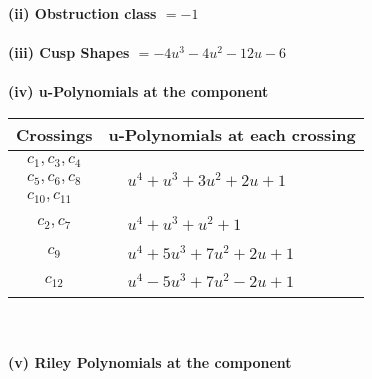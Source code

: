 \documentclass[1p]{elsarticle_modified}
\theoremstyle{definition}
\begin{document}
\flushleft \textbf{(ii) Obstruction class $= -1$}\\~\\
\flushleft \textbf{(iii) Cusp Shapes $= -4 u^3-4 u^2-12 u-6$}\\~\\
\newpage\renewcommand{\arraystretch}{1}
\flushleft \textbf{(iv) u-Polynomials at the component}\newline \\
\begin{tabular}{m{50pt}|m{274pt}}
Crossings & \hspace{64pt}u-Polynomials at each crossing \\
\hline $$\begin{aligned}c_{1},c_{3},c_{4}\\c_{5},c_{6},c_{8}\\c_{10},c_{11}\end{aligned}$$&$\begin{aligned}
&u^4+u^3+3 u^2+2 u+1
\end{aligned}$\\
\hline $$\begin{aligned}c_{2},c_{7}\end{aligned}$$&$\begin{aligned}
&u^4+u^3+u^2+1
\end{aligned}$\\
\hline $$\begin{aligned}c_{9}\end{aligned}$$&$\begin{aligned}
&u^4+5 u^3+7 u^2+2 u+1
\end{aligned}$\\
\hline $$\begin{aligned}c_{12}\end{aligned}$$&$\begin{aligned}
&u^4-5 u^3+7 u^2-2 u+1
\end{aligned}$\\
\hline
\end{tabular}\\~\\
\newpage\renewcommand{\arraystretch}{1}
\flushleft \textbf{(v) Riley Polynomials at the component}\newline \\
\end{document}
